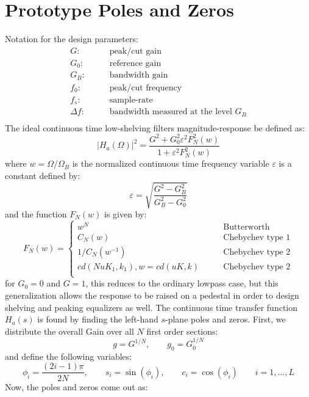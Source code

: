 \section{Prototype Poles and Zeros}

Notation for the design parameters: 
\begin{equation}
\begin{aligned}
 G:        \qquad & \text{peak/cut gain}                         \\
 G_0:      \qquad & \text{reference gain}                        \\
 G_B:      \qquad & \text{bandwidth gain}                        \\ 
 f_0:      \qquad & \text{peak/cut frequency}                    \\ 
 f_s:      \qquad & \text{sample-rate}                           \\
 \Delta f: \qquad & \text{bandwidth measured at the level $G_B$} \\  
\end{aligned}
\end{equation}
The ideal continuous time low-shelving filters magnitude-response be defined as:
\begin{equation}
 |H_a(\Omega)|^2 = \frac{G^2 + G_0^2 \varepsilon^2 F_N^2(w)}{1 + \varepsilon^2 F_N^2(w)}
\end{equation}
where $w=\Omega / \Omega_B$ is the normalized continuous time frequency variable $\varepsilon$ is a constant defined by:
\begin{equation}
 \varepsilon = \sqrt{ \frac{G^2-G_B^2}{G_B^2-G_0^2} }
\end{equation}
and the function $F_N(w)$ is given by:
\begin{equation}
 F_N(w) = 
 \begin{cases}
  w^N                               \qquad & \text{Butterworth}          \\
  C_N(w)                            \qquad & \text{Chebychev type 1}     \\
  1/C_N(w^{-1})                     \qquad & \text{Chebychev type 2}     \\ 
  cd(N u K_1, k_1), w = cd(uK, k)   \qquad & \text{Chebychev type 2}     \\  
 \end{cases}
\end{equation}
for $G_0=0$ and $G=1$, this reduces to the ordinary lowpass case, but this generalization allows the response to be raised on a pedestal in order to design shelving and peaking equalizers as well. The continuous time transfer function $H_a(s)$ is found by finding the left-hand $s$-plane poles and zeros. First, we distribute the overall Gain over all $N$ first order sections:
\begin{equation}
 g = G^{1/N} , \qquad g_0 = G_0^{1/N}
\end{equation}
and define the following variables:
\begin{equation}
 \phi_i = \frac{(2i - 1) \pi}{2N}, \qquad s_i = \sin(\phi_i), \qquad c_i = \cos(\phi_i)
 \qquad i = 1, \ldots, L
\end{equation}
Now, the poles and zeros come out as:

